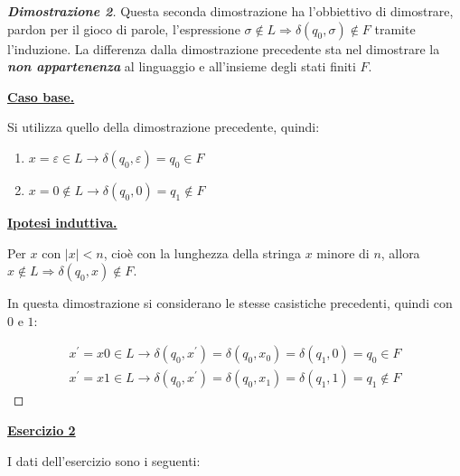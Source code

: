 \documentclass[a4paper]{article}
\begin{document}
	\newpage

	\begin{proof}[\textcolor{Blue3}{\textbf{Dimostrazione 2}}]
		Questa seconda dimostrazione ha l'obbiettivo di dimostrare, pardon per il gioco di parole, l'espressione $\sigma \notin L \Longrightarrow \delta\left(q_{0}, \sigma\right) \notin F$ tramite l'induzione. La differenza dalla dimostrazione precedente sta nel dimostrare la \textbf{\emph{non appartenenza}} al linguaggio e all'insieme degli stati finiti $F$.\newline
		
		\noindent
		\textbf{\underline{Caso base.}}\newline
		
		\noindent
		Si utilizza quello della dimostrazione precedente, quindi:
		
		\begin{enumerate}
			\item $x = \varepsilon \in L \longrightarrow \delta\left(q_{0}, \varepsilon\right) = q_{0} \in F$
			\item $x = 0 \notin L \longrightarrow \delta\left(q_{0}, 0\right) = q_{1} \notin F$
		\end{enumerate}
	
		\noindent
		\textbf{\underline{Ipotesi induttiva.}}\newline
		
		\noindent
		Per $x$ con $|x| < n$, cioè con la lunghezza della stringa $x$ minore di $n$, allora $x \notin L \Longrightarrow \delta\left(q_{0}, x\right) \notin F$.
		
		\noindent
		In questa dimostrazione si considerano le stesse casistiche precedenti, quindi con $0$ e $1$:
		
		\begin{gather*}
			x^{'} = x 0 \in L \longrightarrow \delta\left(q_{0}, x^{'}\right) = \delta\left(q_{0}, x_{0}\right) = \delta\left(q_{1}, 0\right) = q_{0} \in F \\
			x^{'} = x 1 \in L \longrightarrow \delta\left(q_{0}, x^{'}\right) = \delta\left(q_{0}, x_{1}\right) = \delta\left(q_{1}, 1\right) = q_{1} \notin F
		\end{gather*}
	\end{proof}

	\newpage
	
	\noindent
	\textcolor{Red3}{\textbf{\underline{Esercizio 2}}}\newline
	
	\noindent
	I dati dell'esercizio sono i seguenti:
	
\end{document}
